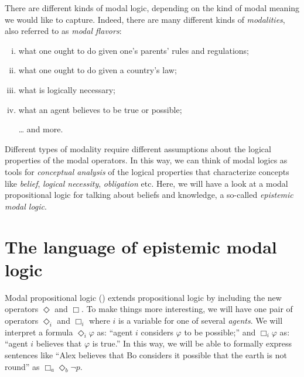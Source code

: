 \documentclass[nobib,nofonts]{tufte-handout}
\newcommand{\modlog}{\acro{ModLog}}
\begin{document}
There are different kinds of modal logic, depending on the kind of modal meaning we would like to capture.
Indeed, there are many different kinds of \emph{modalities}, also referred to as \emph{modal flavors}:
\begin{enumerate}[(i)]
  \item what one ought to do given one's parents' rules and regulations;
  \item what one ought to do given a country's law;
  \item what is logically necessary;
  \item what an agent believes to be true or possible;
  \item[\dots] and more.
\end{enumerate}
Different types of modality require different assumptions about the logical properties of the modal operators.
In this way, we can think of modal logics as tools for \emph{conceptual analysis} of the logical properties that characterize concepts like \emph{belief}, \emph{logical necessity}, \emph{obligation} etc.
Here, we will have a look at a modal propositional logic for talking about beliefs and knowledge, a so-called \emph{epistemic modal logic}.

\section{The language of epistemic modal logic}

Modal propositional logic (\modlog) extends propositional logic by including the new operators $\Diamond$ and $\Box$.
To make things more interesting, we will have one pair of operators $\Diamond_{i}$ and $\Box_{i}$ where $i$ is a variable for one of several \emph{agents}.
We will interpret a formula $\Diamond_{i} \varphi$ as: ``agent $i$ considers $\varphi$ to be possible;''
and $\Box_{i}\varphi$ as: ``agent $i$ believes that $\varphi$ is true.''
In this way, we will be able to formally express sentences like ``Alex believes that Bo considers it possible that the earth is not round'' as $\Box_{a} \Diamond_{b} \neg p$.
\end{document}
